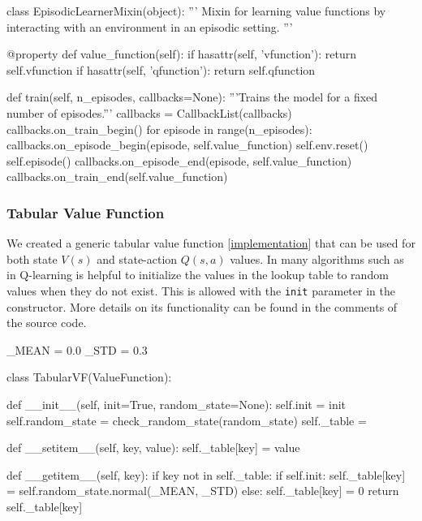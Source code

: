 \documentclass{article}
\newcommand{\GithubURL}[1]{[\href{https://github.com/davidrobles/mlnd-capstone-code/blob/master/#1}{implementation}]}
\begin{document}
\begin{python}
class EpisodicLearnerMixin(object):
    '''
    Mixin for learning value functions by interacting with an
    environment in an episodic setting.
    '''

    @property
    def value_function(self):
        if hasattr(self, 'vfunction'):
            return self.vfunction
        if hasattr(self, 'qfunction'):
            return self.qfunction

    def train(self, n_episodes, callbacks=None):
        '''Trains the model for a fixed number of episodes.'''
        callbacks = CallbackList(callbacks)
        callbacks.on_train_begin()
        for episode in range(n_episodes):
            callbacks.on_episode_begin(episode, self.value_function)
            self.env.reset()
            self.episode()
            callbacks.on_episode_end(episode, self.value_function)
        callbacks.on_train_end(self.value_function)
\end{python}

\subsubsection{Tabular Value Function}

We created a generic tabular value function \GithubURL{capstone/rl/value_functions/tabular.py} that
can be used for both state $V(s)$ and state-action $Q(s, a)$ values. In many algorithms such as in
Q-learning is helpful to initialize the values in the lookup table to random values when they do not
exist. This is allowed with the \texttt{init} parameter in the constructor. More details on its
functionality can be found in the comments of the source code.

\begin{python}
_MEAN = 0.0
_STD = 0.3

class TabularVF(ValueFunction):

    def __init__(self, init=True, random_state=None):
        self.init = init
        self.random_state = check_random_state(random_state)
        self._table = {}

    def __setitem__(self, key, value):
        self._table[key] = value

    def __getitem__(self, key):
        if key not in self._table:
            if self.init:
                self._table[key] = self.random_state.normal(_MEAN, _STD)
            else:
                self._table[key] = 0
        return self._table[key]
\end{python}
\end{document}

